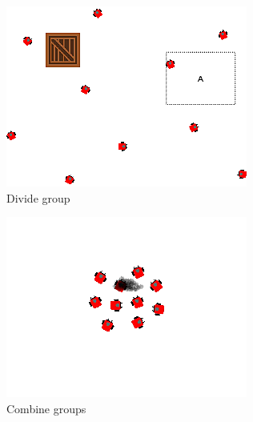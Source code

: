 \documentclass[]{article}
\begin{document}
\begin{figure}
\begin{subfigure}{0.42\textwidth}
		\includegraphics[width=\linewidth]{slide_images/Swarm_Robot_Control_-_10_Robot_0027.png}
		\caption{Divide group}
		\label{fig:sub2}
	\end{subfigure}%
	\begin{subfigure}{0.42\textwidth}
		\centering
		\includegraphics[width=\linewidth]{slide_images/Swarm_Robot_Control_-_10_Robot_0029.png}
		\caption{Combine groups}
		\label{fig:sub1}
	\end{subfigure}
	\begin{subfigure}{0.42\textwidth}
		\centering

\end{subfigure}
\end{figure}
\end{document}
